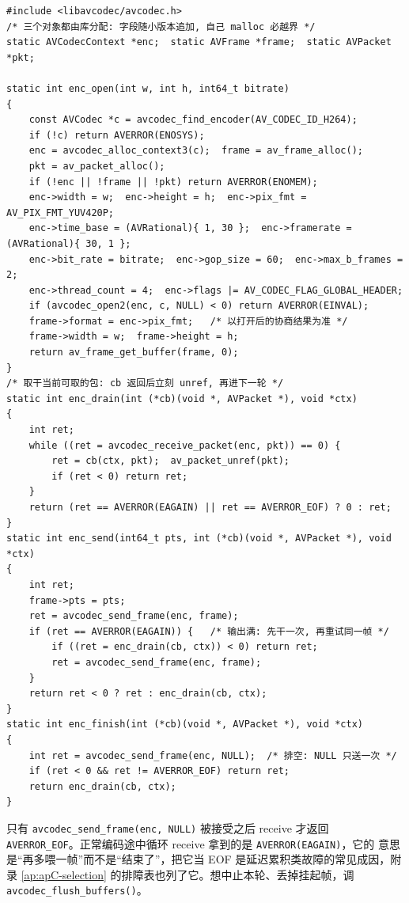 \documentclass[12pt,a4paper,fontset=fandol]{ctexbook}
\newcommand{\Fn}[1]{\texttt{#1()}}
\newcommand{\Tp}[1]{\texttt{#1}}
\begin{document}
\begin{lstlisting}[style=cstyle,caption={编码侧最小闭环：打开编码器、送一帧、收一包、发 NULL 排空},label={lst:ch06-sendrecv}]
#include <libavcodec/avcodec.h>
/* 三个对象都由库分配: 字段随小版本追加, 自己 malloc 必越界 */
static AVCodecContext *enc;  static AVFrame *frame;  static AVPacket *pkt;

static int enc_open(int w, int h, int64_t bitrate)
{
    const AVCodec *c = avcodec_find_encoder(AV_CODEC_ID_H264);
    if (!c) return AVERROR(ENOSYS);
    enc = avcodec_alloc_context3(c);  frame = av_frame_alloc();
    pkt = av_packet_alloc();
    if (!enc || !frame || !pkt) return AVERROR(ENOMEM);
    enc->width = w;  enc->height = h;  enc->pix_fmt = AV_PIX_FMT_YUV420P;
    enc->time_base = (AVRational){ 1, 30 };  enc->framerate = (AVRational){ 30, 1 };
    enc->bit_rate = bitrate;  enc->gop_size = 60;  enc->max_b_frames = 2;
    enc->thread_count = 4;  enc->flags |= AV_CODEC_FLAG_GLOBAL_HEADER;
    if (avcodec_open2(enc, c, NULL) < 0) return AVERROR(EINVAL);
    frame->format = enc->pix_fmt;   /* 以打开后的协商结果为准 */
    frame->width = w;  frame->height = h;
    return av_frame_get_buffer(frame, 0);
}
/* 取干当前可取的包: cb 返回后立刻 unref, 再进下一轮 */
static int enc_drain(int (*cb)(void *, AVPacket *), void *ctx)
{
    int ret;
    while ((ret = avcodec_receive_packet(enc, pkt)) == 0) {
        ret = cb(ctx, pkt);  av_packet_unref(pkt);
        if (ret < 0) return ret;
    }
    return (ret == AVERROR(EAGAIN) || ret == AVERROR_EOF) ? 0 : ret;
}
static int enc_send(int64_t pts, int (*cb)(void *, AVPacket *), void *ctx)
{
    int ret;
    frame->pts = pts;
    ret = avcodec_send_frame(enc, frame);
    if (ret == AVERROR(EAGAIN)) {   /* 输出满: 先干一次, 再重试同一帧 */
        if ((ret = enc_drain(cb, ctx)) < 0) return ret;
        ret = avcodec_send_frame(enc, frame);
    }
    return ret < 0 ? ret : enc_drain(cb, ctx);
}
static int enc_finish(int (*cb)(void *, AVPacket *), void *ctx)
{
    int ret = avcodec_send_frame(enc, NULL);  /* 排空: NULL 只送一次 */
    if (ret < 0 && ret != AVERROR_EOF) return ret;
    return enc_drain(cb, ctx);
}
\end{lstlisting}

\begin{warning}[title={排空不等于关闭}]
只有 \Tp{avcodec\_send\_frame(enc, NULL)} 被接受之后 receive 才返回
\Tp{AVERROR\_EOF}。正常编码途中循环 receive 拿到的是 \Tp{AVERROR(EAGAIN)}，它的
意思是``再多喂一帧''而不是``结束了''，把它当 EOF 是延迟累积类故障的常见成因，附录
\ref{ap:apC-selection} 的排障表也列了它。想中止本轮、丢掉挂起帧，调
\Fn{avcodec\_flush\_buffers}。
\end{warning}
\end{document}
